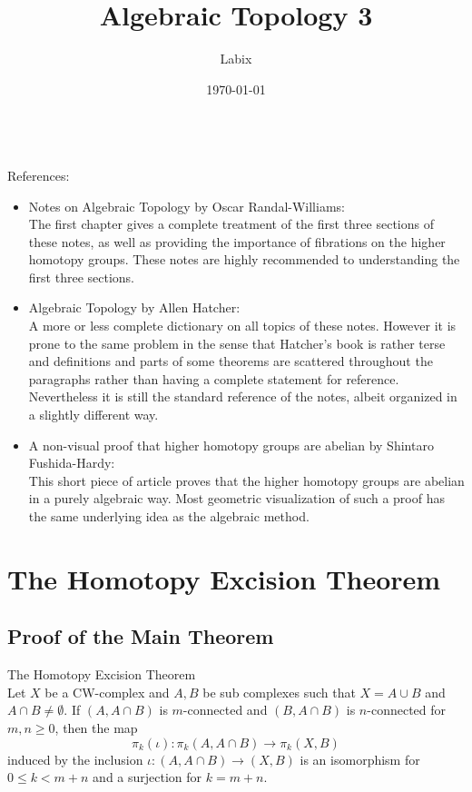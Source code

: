 \documentclass[a4paper]{article}
\title{Algebraic Topology 3}
\author{Labix}
\date{\today}
\begin{document}
\maketitle
\begin{abstract}
\end{abstract}
~\\
References: 
\begin{itemize}
\item Notes on Algebraic Topology by Oscar Randal-Williams: \\
The first chapter gives a complete treatment of the first three sections of these notes, as well as providing the importance of fibrations on the higher homotopy groups. These notes are highly recommended to understanding the first three sections. 

\item Algebraic Topology by Allen Hatcher: \\
A more or less complete dictionary on all topics of these notes. However it is prone to the same problem in the sense that Hatcher's book is rather terse and definitions and parts of some theorems are scattered throughout the paragraphs rather than having a complete statement for reference. Nevertheless it is still the standard reference of the notes, albeit organized in a slightly different way. 

\item A non-visual proof that higher homotopy groups are abelian by Shintaro Fushida-Hardy: \\
This short piece of article proves that the higher homotopy groups are abelian in a purely algebraic way. Most geometric visualization of such a proof has the same underlying idea as the algebraic method. 
\end{itemize}

\pagebreak
\tableofcontents

\pagebreak
\section{The Homotopy Excision Theorem}
\subsection{Proof of the Main Theorem}
\begin{thm}{The Homotopy Excision Theorem}{}\\
Let $X$ be a CW-complex and $A,B$ be sub complexes such that $X=A\cup B$ and $A\cap B\neq\emptyset$. If $(A,A\cap B)$ is $m$-connected and $(B,A\cap B)$ is $n$-connected for $m,n\geq 0$, then the map $$\pi_k(\iota):\pi_k(A,A\cap B)\to\pi_k(X,B)$$ induced by the inclusion $\iota:(A,A\cap B)\to(X,B)$ is an isomorphism for $0\leq k<m+n$ and a surjection for $k=m+n$. 
\end{thm}
\end{document}
